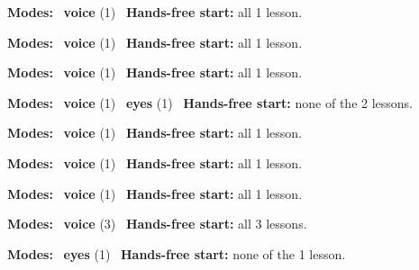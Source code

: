 \expandafter\def\csname hlchaptermodality78\endcsname{%
  {\small\noindent
    \textbf{Modes:} \hlvoicesign{}~\textbf{voice} (1)\quad
    \hlvoicesign{}~\textbf{Hands-free start:} all 1 lesson.%
    \par}\medskip
}

\expandafter\def\csname hlchaptermodality79\endcsname{%
  {\small\noindent
    \textbf{Modes:} \hlvoicesign{}~\textbf{voice} (1)\quad
    \hlvoicesign{}~\textbf{Hands-free start:} all 1 lesson.%
    \par}\medskip
}

\expandafter\def\csname hlchaptermodality80\endcsname{%
  {\small\noindent
    \textbf{Modes:} \hlvoicesign{}~\textbf{voice} (1)\quad
    \hlvoicesign{}~\textbf{Hands-free start:} all 1 lesson.%
    \par}\medskip
}

\expandafter\def\csname hlchaptermodality81\endcsname{%
  {\small\noindent
    \textbf{Modes:} \hlvoicesign{}~\textbf{voice} (1) \quad \hlsightsign{}~\textbf{eyes} (1)\quad
    \hlvoicesign{}~\textbf{Hands-free start:} none of the 2 lessons.%
    \par}\medskip
}

\expandafter\def\csname hlchaptermodality82\endcsname{%
  {\small\noindent
    \textbf{Modes:} \hlvoicesign{}~\textbf{voice} (1)\quad
    \hlvoicesign{}~\textbf{Hands-free start:} all 1 lesson.%
    \par}\medskip
}

\expandafter\def\csname hlchaptermodality83\endcsname{%
  {\small\noindent
    \textbf{Modes:} \hlvoicesign{}~\textbf{voice} (1)\quad
    \hlvoicesign{}~\textbf{Hands-free start:} all 1 lesson.%
    \par}\medskip
}

\expandafter\def\csname hlchaptermodality84\endcsname{%
  {\small\noindent
    \textbf{Modes:} \hlvoicesign{}~\textbf{voice} (1)\quad
    \hlvoicesign{}~\textbf{Hands-free start:} all 1 lesson.%
    \par}\medskip
}

\expandafter\def\csname hlchaptermodality85\endcsname{%
  {\small\noindent
    \textbf{Modes:} \hlvoicesign{}~\textbf{voice} (3)\quad
    \hlvoicesign{}~\textbf{Hands-free start:} all 3 lessons.%
    \par}\medskip
}

\expandafter\def\csname hlchaptermodality86\endcsname{%
  {\small\noindent
    \textbf{Modes:} \hlsightsign{}~\textbf{eyes} (1)\quad
    \hlvoicesign{}~\textbf{Hands-free start:} none of the 1 lesson.%
    \par}\medskip
}

